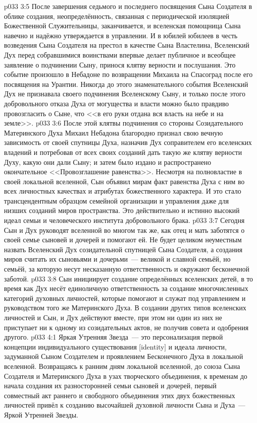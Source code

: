 \vs p033 3:5 После завершения седьмого и последнего посвящения Сына Создателя в облике создания, неопределённость, связанная с периодической изоляцией Божественной Служительницы, заканчивается, и вселенская помощница Сына навечно и надёжно утверждается в управлении. И в юбилей юбилеев в честь возведения Сына Создателя на престол в качестве Сына Властелина, Вселенский Дух перед собравшимися воинствами впервые делает публичное и всеобщее заявление о подчинении Сыну, принося клятву верности и послушания. Это событие произошло в Небадоне по возвращении Михаила на Спасоград после его посвящения на Урантии. Никогда до этого знаменательного события Вселенский Дух не признавала своего подчинения Вселенскому Сыну, и только после этого добровольного отказа Духа от могущества и власти можно было правдиво провозгласить о Сыне, что <<в его руки отдана вся власть на небе и на земле>>.
\vs p033 3:6 После этой клятвы подчинения со стороны Созидательного Материнского Духа Михаил Небадона благородно признал свою вечную зависимость от своей спутницы Духа, назначив Дух соправителем его вселенских владений и потребовав от всех своих созданий дать такую же клятву верности Духу, какую они дали Сыну; и затем было издано и распространено окончательное <<Провозглашение равенства>>. Несмотря на полновластие в своей локальной вселенной, Сын объявил мирам факт равенства Духа с ним во всех личностных качествах и атрибутах божественного характера. И это стало трансцендентным образцом семейной организации и управления даже для низших созданий миров пространства. Это действительно и истинно высокий идеал семьи и человеческого института добровольного брака.
\vs p033 3:7 Сегодня Сын и Дух руководят вселенной во многом так же, как отец и мать заботятся о своей семье сыновей и дочерей и помогают ей. Не будет целиком неуместным назвать Вселенский Дух созидательной спутницей Сына Создателя, а создания миров считать их сыновьями и дочерьми~--- великой и славной семьёй, но семьёй, за которую несут несказанную ответственность и окружают бесконечной заботой.
\vs p033 3:8 \pc Сын инициирует создание определённых вселенских детей, в то время как Дух несёт единоличную ответственность за создание многочисленных категорий духовных личностей, которые помогают и служат под управлением и руководством того же Материнского Духа. В создании других типов вселенских личностей и Сын, и Дух действуют вместе, при этом ни один из них не приступает ни к одному из созидательных актов, не получив совета и одобрения другого.
\vs p033 4:1 Яркая Утренняя Звезда~--- это персонализация первой концепции индивидуального существования [identity] и идеала личности, задуманной Сыном Создателем и проявлением Бесконечного Духа в локальной вселенной. Возвращаясь к ранним дням локальной вселенной, до союза Сына Создателя и Материнского Духа в узах творческого объединения, к временам до начала создания их разносторонней семьи сыновей и дочерей, первый совместный акт раннего и свободного объединения этих двух божественных личностей привёл к созданию высочайшей духовной личности Сына и Духа~--- Яркой Утренней Звезды.
